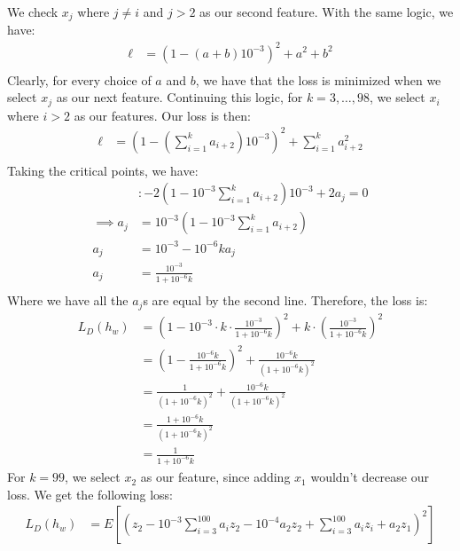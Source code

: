 \documentclass{amsart}
\theoremstyle{definition}
\begin{document}
\begin{enumerate}[(a)]
\begin{enumerate}[i.]
        We check $x_j$ where $j \neq i$ and $j > 2$ as our second feature. With the same logic, we have:
        \begin{align*}
          \ell &= (1 - (a+b) 10^{-3})^2 + a^2 + b^2\\
        \end{align*}
        Clearly, for every choice of $a$ and $b$, we have that the loss is minimized when we select $x_j$ as our next feature.
        Continuing this logic, for $k = 3, \ldots, 98$, we select $x_i$ where $i > 2$ as our features. Our loss is then:
        \begin{align*}
          \ell &= \left( 1 - \left(\sum_{i = 1}^{k} a_{i + 2} \right) 10^{-3}\right)^2 + \sum_{i = 1}^{k} a_{i + 2}^2\\
        \end{align*}
        Taking the critical points, we have:
        \begin{align*}
          [a_j] &: -2 \left(1 - 10^{-3}\sum_{i = 1}^{k} a_{i + 2}\right) 10^{-3} + 2 a_j = 0\\
          \implies a_j &= 10^{-3} \left(1 - 10^{-3}\sum_{i = 1}^{k} a_{i + 2}\right)\\
          a_j &= 10^{-3} - 10^{-6}k a_j\\
          a_j &= \frac{10^{-3}}{1 + 10^{-6}k}\\
        \end{align*}
        Where we have all the $a_j$s are equal by the second line. 
        Therefore, the loss is:
        \begin{align*}
          L_D(h_w) &= \left(1 - 10^{-3} \cdot k \cdot \frac{10^{-3}}{1 + 10^{-6}k}\right)^2 + k \cdot \left(\frac{10^{-3}}{1 + 10^{-6}k}\right)^2\\
          &= \left(1 - \frac{10^{-6}k}{1 + 10^{-6}k}\right)^2 + \frac{10^{-6}k}{(1 + 10^{-6}k)^2}\\
          &= \frac{1}{(1 + 10^{-6}k)^2} + \frac{10^{-6}k}{(1 + 10^{-6}k)^2}\\
          &= \frac{1 + 10^{-6}k}{(1 + 10^{-6}k)^2}\\
          &= \frac{1}{1 + 10^{-6}k}
        \end{align*}
        For $k = 99$, we select $x_2$ as our feature, since adding $x_1$ wouldn't decrease our loss. 
        We get the following loss:
        \begin{align*}
          L_D(h_w) &= E\left[\left(z_2 - 10^{-3}\sum_{i = 3}^{100} a_i z_2 - 10^{-4} a_2 z_2 + \sum_{i = 3}^{100} a_i z_i + a_2 z_1\right)^2\right]\\

\end{align*}
\end{enumerate}
\end{enumerate}
\end{document}
